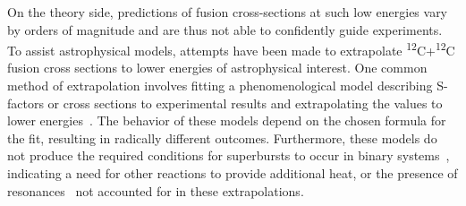 On the theory side, predictions of fusion cross-sections at such low energies vary by orders of magnitude and are thus not able to confidently guide experiments. 
To assist astrophysical models, attempts have been made to extrapolate \textsuperscript{12}C+\textsuperscript{12}C fusion cross sections to lower energies of astrophysical interest. 
One common method of extrapolation involves fitting a phenomenological model describing S-factors or cross sections to experimental results and extrapolating the values to lower energies~\protect\cite{fowler1975,jiang2007}.
The behavior of these models depend on the chosen formula for the fit, resulting in radically different outcomes.
Furthermore, these models 
do not produce the required conditions for superbursts to occur in binary systems~\protect\cite{cumming2006}, indicating a need for other reactions to provide additional heat, or the presence of resonances~\protect\cite{cooper2009} not accounted for in these extrapolations. 




